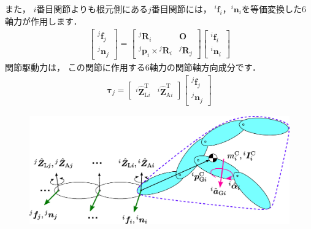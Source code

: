 \documentclass{jsarticle}
\begin{document}
また，
$i$番目関節よりも根元側にある$j$番目関節には，
${}^{i}\bm{f}_{i}$，${}^{i}\bm{n}_{i}$を等価変換した6軸力が作用します．
\begin{align*}
\left[\begin{array}{c}
{}^{j}\bm{f}_{j}
\\
{}^{j}\bm{n}_{j}
\end{array}\right]
=
\left[\begin{array}{cc}
{}^{j}\bm{R}_{i} & \bm{O}
\\
{}^{j}\bm{p}_{i}\times{}^{j}\bm{R}_{i} & {}^{j}\bm{R}_{j}
\end{array}\right]
\left[\begin{array}{c}
{}^{i}\bm{f}_{i}
\\
{}^{i}\bm{n}_{i}
\end{array}\right]
\end{align*}
関節駆動力は，
この関節に作用する6軸力の関節軸方向成分です．
\begin{align*}
\bm{\tau}_{j}=\left[\begin{array}{cc}
{}^{i}\hat{\bm{Z}}_{\mathrm{L}i}^{\mathrm{T}}
&
{}^{i}\hat{\bm{Z}}_{\mathrm{A}i}^{\mathrm{T}}
\end{array}\right]
\left[\begin{array}{c}
{}^{j}\bm{f}_{j}
\\
{}^{j}\bm{n}_{j}
\end{array}\right]
\end{align*}

\begin{figure}[h]
\begin{center}
\includegraphics[width=.7\textwidth]{crb_force.eps}
\end{center}
\end{figure}
\end{document}
